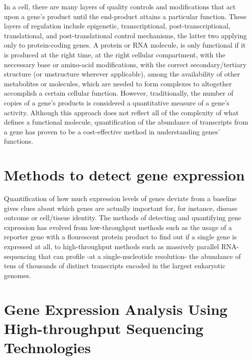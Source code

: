\documentclass[12pt,]{krantz}
\begin{document}
In a cell, there are many layers of quality controls and modifications that act upon a gene's product until the end-product attains a particular function. These layers of regulation include epigenetic, transcriptional, post-transcriptional, translational, and post-translational control mechanisms, the latter two applying only to protein-coding genes. A protein or RNA molecule, is only functional if it is produced at the right time, at the right cellular compartment, with the neccessary base or amino-acid modifications, with the correct secondary/tertiary structure (or unstructure wherever applicable), among the availability of other metabolites or molecules, which are needed to form complexes to altogether accomplish a certain cellular function. However, traditionally, the number of copies of a gene's products is considered a quantitative measure of a gene's activity. Although this approach does not reflect all of the complexity of what defines a functional molecule, quantification of the abundance of transcripts from a gene has proven to be a cost-effective method in understanding genes' functions.

\hypertarget{methods-to-detect-gene-expression}{%
\section{Methods to detect gene expression}\label{methods-to-detect-gene-expression}}

Quantification of how much expression levels of genes deviate from a baseline gives clues about which genes are actually important for, for instance, disease outcome or cell/tissue identity. The methods of detecting and quantifying gene expression has evolved from low-throughput methods such as the usage of a reporter gene with a flourescent protein product to find out if a single gene is expressed at all, to high-throughput methods such as massively parallel RNA-sequencing that can profile -at a single-nucleotide resolution- the abundance of tens of thousands of distinct transcripts encoded in the largest eukaryotic genomes.

\hypertarget{gene-expression-analysis-using-high-throughput-sequencing-technologies}{%
\section{Gene Expression Analysis Using High-throughput Sequencing Technologies}\label{gene-expression-analysis-using-high-throughput-sequencing-technologies}}
\end{document}
